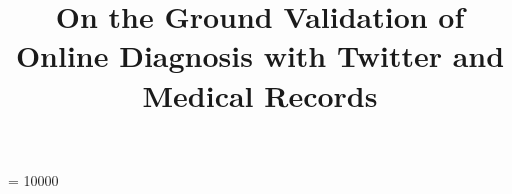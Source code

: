 \documentclass{acm_proc_article-sp}
\begin{document}
\widowpenalty = 10000 

\title{On the Ground Validation of Online Diagnosis with Twitter and Medical Records}

%
%
%
%
%
\end{document}
